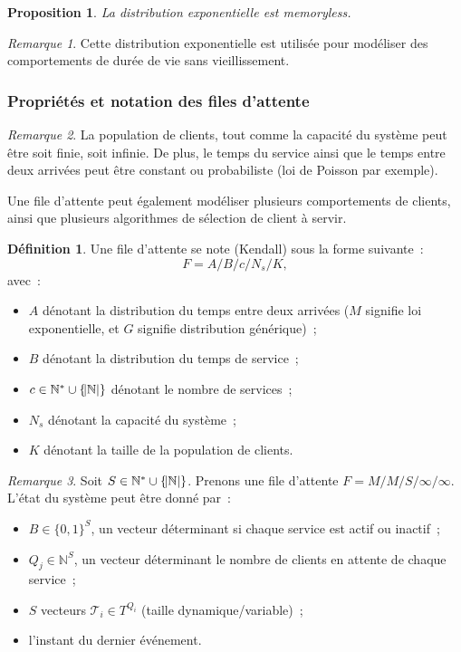 \documentclass{article}
\newtheorem{prp}[thm]{Proposition}
\theoremstyle{definition}
\newtheorem{déf}[thm]{Définition}
\theoremstyle{remark}
\newtheorem*{rmq}{Remarque}
\newcommand{\N}{\mathbb N}
\begin{document}
	\begin{prp} La distribution exponentielle est memoryless.
	\end{prp}

	\begin{rmq} Cette distribution exponentielle est utilisée pour modéliser des comportements de durée de vie sans vieillissement.
	\end{rmq}

		\subsubsection{Propriétés et notation des files d'attente}

	\begin{rmq} La population de clients, tout comme la capacité du système peut être soit finie, soit infinie. De plus, le temps du service ainsi que le temps
	entre deux arrivées peut être constant ou probabiliste (loi de Poisson par exemple).

	Une file d'attente peut également modéliser plusieurs comportements de clients, ainsi que plusieurs algorithmes de sélection de client à servir.
	\end{rmq}

	\begin{déf} Une file d'attente se note (Kendall) sous la forme suivante~:
	\[F = A/B/c/N_s/K,\]
	avec~:
	\begin{itemize}
		\item $A$ dénotant la distribution du temps entre deux arrivées ($M$ signifie loi exponentielle, et $G$ signifie distribution générique)~;
		\item $B$ dénotant la distribution du temps de service~;
		\item $c \in \N^* \cup \{\abs {\N}\}$ dénotant le nombre de services~;
		\item $N_s$ dénotant la capacité du système~;
		\item $K$ dénotant la taille de la population de clients.
	\end{itemize}
	\end{déf}

	\begin{rmq} Soit $S \in \N^* \cup \{\abs {\N}\}$. Prenons une file d'attente $F = M/M/S/\infty/\infty$. L'état du système peut être donné par~:
	\begin{itemize}
		\item $B \in \{0, 1\}^S$, un vecteur déterminant si chaque service est actif ou inactif~;
		\item $Q_j \in \N^S$, un vecteur déterminant le nombre de clients en attente de chaque service~;
		\item $S$ vecteurs $\mathcal T_i \in T^{Q_i}$ (taille dynamique/variable)~;
		\item l'instant du dernier événement.
	\end{itemize}
	\end{rmq}
\end{document}

